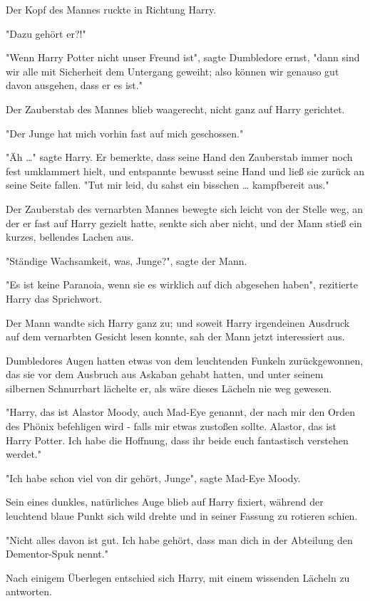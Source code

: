 {Der Kopf des Mannes ruckte in Richtung Harry.

"Dazu gehört er?!"

"Wenn Harry Potter nicht unser Freund ist", sagte Dumbledore ernst, "dann sind wir alle mit Sicherheit dem Untergang geweiht; also können wir genauso gut davon ausgehen, dass er es ist."

Der Zauberstab des Mannes blieb waagerecht, nicht ganz auf Harry gerichtet.

"Der Junge hat mich vorhin fast auf mich geschossen."

"Äh …" sagte Harry. Er bemerkte, dass seine Hand den Zauberstab immer noch fest umklammert hielt, und entspannte bewusst seine Hand und ließ sie zurück an seine Seite fallen. "Tut mir leid, du sahst ein bisschen … kampfbereit aus."

Der Zauberstab des vernarbten Mannes bewegte sich leicht von der Stelle weg, an der er fast auf Harry gezielt hatte, senkte sich aber nicht, und der Mann stieß ein kurzes, bellendes Lachen aus.

"Ständige Wachsamkeit, was, Junge?", sagte der Mann.

"Es ist keine Paranoia, wenn sie es wirklich auf dich abgesehen haben", rezitierte Harry das Sprichwort.

Der Mann wandte sich Harry ganz zu; und soweit Harry irgendeinen Ausdruck auf dem vernarbten Gesicht lesen konnte, sah der Mann jetzt interessiert aus.

Dumbledores Augen hatten etwas von dem leuchtenden Funkeln zurückgewonnen, das sie vor dem Ausbruch aus Askaban gehabt hatten, und unter seinem silbernen Schnurrbart lächelte er, als wäre dieses Lächeln nie weg gewesen.

"Harry, das ist Alastor Moody, auch Mad-Eye genannt, der nach mir den Orden des Phönix befehligen wird - falls mir etwas zustoßen sollte. Alastor, das ist Harry Potter. Ich habe die Hoffnung, dass ihr beide euch fantastisch verstehen werdet."

"Ich habe schon viel von dir gehört, Junge", sagte Mad-Eye Moody.

Sein eines dunkles, natürliches Auge blieb auf Harry fixiert, während der leuchtend blaue Punkt sich wild drehte und in seiner Fassung zu rotieren schien.

"Nicht alles davon ist gut. Ich habe gehört, dass man dich in der Abteilung den Dementor-Spuk nennt."

Nach einigem Überlegen entschied sich Harry, mit einem wissenden Lächeln zu antworten.

}
